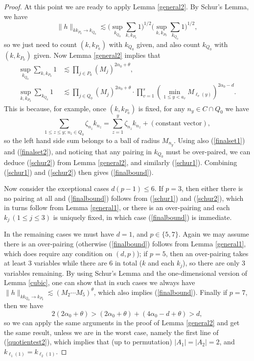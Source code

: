 \documentclass[11 pt,reqno]{amsart}
\theoremstyle{definition}
\theoremstyle{remark}
\numberwithin{equation}{section}
\begin{document}
{\begin{proof}
At this point we are ready to apply Lemma \ref{general2}. By Schur's Lemma, we have
\[\|h\|_{kk_{P_0}\to k_{Q_0}}\lesssim\bigg(\sup_{k_{Q_0}}\sum_{k,k_{P_0}}1\bigg)^{1/2}\bigg(\sup_{k,k_{P_0}}\sum_{k_{Q_0}}1\bigg)^{1/2},\] so we just need to count $(k,k_{P_0})$ with $k_{Q_0}$ given, and also count $k_{Q_0}$ with $(k,k_{P_0})$ given. Now Lemma \ref{general2} implies that
\begin{align}\label{schur1}\sup_{k_{Q_0}}\sum_{k,k_{P_0}}1&\lesssim\prod_{j\in P_0}(M_j)^{2\alpha_0+\theta},\\\label{schur2}\sup_{k,k_{P_0}}\sum_{k_{Q_0}}1&\lesssim\prod_{j\in Q_0}(M_j)^{2\alpha_0+\theta}\cdot\prod_{v=1}^s(\min_{1\leq y<a_v}M_{\ell_v(y)})^{2\alpha_0-d}.\end{align} This is because, for example, once $(k,k_{P_0})$ is fixed, for any $n_y\in C\cap Q_0$ we have
\[\sum_{1\leq z\leq y;\,n_z\in Q_0}\zeta_{n_z}k_{n_z}=\sum_{z=1}^y\zeta_{n_z}k_{n_z}+(\textrm{constant vector}),\] so the left hand side sum belongs to a ball of radius $M_{n_y}$. Using also (\ref{finalset1}) and (\ref{finalset2}), and noticing that any pairing in $k_{Q_0}$ must be over-paired, we can deduce (\ref{schur2}) from Lemma \ref{general2}, and similarly (\ref{schur1}). Combining (\ref{schur1}) and (\ref{schur2}) then gives (\ref{finalbound}).

Now consider the exceptional cases $d(p-1)\leq 6$. If $p=3$, then either there is no pairing at all and (\ref{finalbound}) follows from (\ref{schur1}) and (\ref{schur2}), which in turns follow from Lemma \ref{general1}, or there is an over-pairing and each $k_j\,(1\leq j\leq 3)$ is uniquely fixed, in which case (\ref{finalbound}) is immediate.

In the remaining cases we must have $d=1$, and $p\in\{5,7\}$. Again we may assume there is an over-pairing (otherwise (\ref{finalbound}) follows from Lemma \ref{general1}, which does require any condition on $(d,p)$); if $p=5$, then an over-pairing takes at least 3 variables while there are 6 in total ($k$ and each $k_j$), so there are only 3 variables remaining. By using Schur's Lemma and the one-dimensional version of Lemma \ref{cubic}, one can show that in such cases we always have $\|h\|_{kk_{Q_0}\to k_{P_0}}\lesssim (M_2\cdots M_5)^\theta$, which also implies (\ref{finalbound}). Finally if $p=7$, then we have
\[2(2\alpha_0+\theta)>(2\alpha_0+\theta)+(4\alpha_0-d+\theta)>d,\] so we can apply the same arguments in the proof of Lemma \ref{general2} and get the same result, unless we are in the worst case, namely the first line of (\ref{quotientest2}), which implies that (up to permutation) $|A_1|=|A_2|=2$, and $k_{\ell_1(1)}=k_{\ell_2(1)}$.


\end{proof}}
\end{document}

